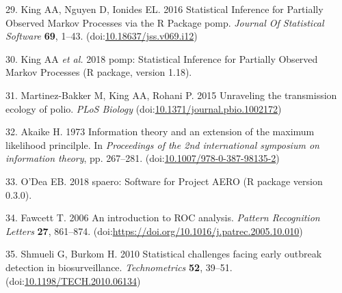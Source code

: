 \documentclass[3p]{elsarticle} %
\begin{document}
\leavevmode\hypertarget{ref-King2016}{}%
29. King AA, Nguyen D, Ionides EL. 2016 Statistical Inference for
Partially Observed Markov Processes via the R Package pomp.
\emph{Journal Of Statistical Software} \textbf{69}, 1--43.
(doi:\href{https://doi.org/10.18637/jss.v069.i12}{10.18637/jss.v069.i12})

\leavevmode\hypertarget{ref-King2018}{}%
30. King AA \emph{et al.} 2018 pomp: Statistical Inference for Partially
Observed Markov Processes (R package, version 1.18).

\leavevmode\hypertarget{ref-Martinez-Bakker2015}{}%
31. Martinez-Bakker M, King AA, Rohani P. 2015 Unraveling the
transmission ecology of polio. \emph{PLoS Biology}
(doi:\href{https://doi.org/10.1371/journal.pbio.1002172}{10.1371/journal.pbio.1002172})

\leavevmode\hypertarget{ref-Akaike1973}{}%
32. Akaike H. 1973 Information theory and an extension of the maximum
likelihood princilple. In \emph{Proceedings of the 2nd international
symposium on information theory}, pp. 267--281.
(doi:\href{https://doi.org/10.1007/978-0-387-98135-2}{10.1007/978-0-387-98135-2})

\leavevmode\hypertarget{ref-ODea2018}{}%
33. O'Dea EB. 2018 spaero: Software for Project AERO (R package version
0.3.0).

\leavevmode\hypertarget{ref-Fawcett2006}{}%
34. Fawcett T. 2006 An introduction to ROC analysis. \emph{Pattern
Recognition Letters} \textbf{27}, 861--874.
(doi:\href{https://doi.org/https://doi.org/10.1016/j.patrec.2005.10.010}{https://doi.org/10.1016/j.patrec.2005.10.010})

\leavevmode\hypertarget{ref-Shmueli2010}{}%
35. Shmueli G, Burkom H. 2010 Statistical challenges facing early
outbreak detection in biosurveillance. \emph{Technometrics} \textbf{52},
39--51.
(doi:\href{https://doi.org/10.1198/TECH.2010.06134}{10.1198/TECH.2010.06134})
\end{document}
